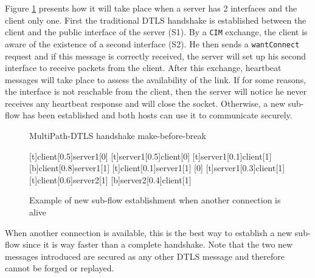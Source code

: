 Figure \ref{fig:Handshake1} presents how it will take place when a server has 2 interfaces and the client only one. First the traditional DTLS handshake is established between the client and the public interface of the server (S1). By a \verb!CIM! exchange, the client is aware of the existence of a second interface (S2). He then sends a \verb!wantConnect! request and if this message is correctly received, the server will set up his second interface to receive packets from the client. After this exchange, heartbeat messages  will take place to assess the availability of the link. If for some reasons, the interface is not reachable from the client, then the server will notice he never receives any heartbeat response and will close the socket. Otherwise, a new sub-flow has been established and both hosts can use it to communicate securely. 


\begin{figure}[!h]
\centering
\begin{msc}[r]{MultiPath-DTLS handshake make-before-break}

\setlength{\instfootheight}{0em}
\setlength{\instheadheight}{0em}
\setlength{\instdist}{0.33\linewidth}
\setlength{\levelheight}{3em}


[t]{client}[0.5]{server1}[0]
\nextlevel
{}[t]{server1}[0.5]{client}[0]
\nextlevel
{}[t]{server1}[0.1]{client}[1]
\nextlevel
{}[b]{client}[0.8]{server1}[1]
\nextlevel[2]
[t]{client}[0.1]{server1}[1]
\nextlevel
{}
[0]
[t]{server1}[0.3]{client}[1]
\nextlevel
{}
\nextlevel
{}[t]{client}[0.6]{server2}[1]
\nextlevel
{}[b]{server2}[0.4]{client}[1]
\nextlevel[2]

\end{msc}
\caption{Example of new sub-flow establishment when another connection is alive}
\label{fig:Handshake1}
\end{figure}

When another connection is available, this is the best way to establish a new sub-flow since it is way faster than a complete handshake. Note that the two new messages introduced are secured as any other DTLS message and therefore cannot be forged or replayed.



